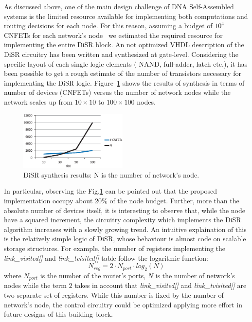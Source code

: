 As discussed above, one of the main design challenge of DNA
Self-Assembled systems is the limited resource available for
implementing both computations and routing decisions for each node.
For this reason, assuming a budget of $10^4$ CNFETs for each network's
node~\cite{liu_jetcs} we estimated the required resource for
implementing the entire DiSR block. An not optimized VHDL description
of the DiSR circuitry has been written and synthesized at gate-level.
Considering the specific layout of each single logic elements ( NAND,
full-adder, latch etc.), it has been possible to get a rough estimate
of the number of transistors necessary for implementing the DiSR
logic.  Figure~\ref{fig:imp_trend} shows the results of synthesis in
terms of number of devices (CNFETs) versus the number of network nodes
while the network scales up from $10\times10$ to $100\times100$ nodes.
\begin{figure}
  \centering
  \includegraphics[width=0.48\textwidth]{pictures/imp_rslt.eps}
  \caption{DiSR synthesis results: N is the number of network's node.}
 \label{fig:imp_trend}
\end{figure}
In particular, observing the Fig.\ref{fig:imp_trend} can 
be pointed out that the proposed implementation occupy  about 20\% of the node budget. 
Further, more than the absolute number of devices itself, it is interesting to
observe that, while the node have a squared increment, the circuitry
complexity which implements the DiSR algorithm increases with a slowly
growing trend.  
An intuitive explaination of this is the relatively simple logic of
DiSR, whose behaviour is almost code on scalable storage structures.
For example, the number of registers implementing the
\emph{link\_visited[]} and \emph{link\_tvisited[]} table follow the
logaritmic function:
\begin{equation}
  \label{eq:imp_trend}
  N_{reg}=2\cdot N_{port} \cdot log_2(N)
\end{equation}
where $N_{port}$ is the number of the router's ports, $N$ is the number 
of network's nodes while the term $2$ takes in account that \emph{link\_visited[]} and 
\emph{link\_tvisited[]} are two separate set of registers. While this number is fixed by 
the number of network's node, the control circuitry could be optimized applying more effort 
in future designs of this building block. 

